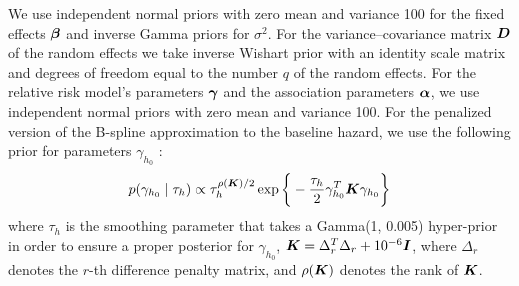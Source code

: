 We use independent normal priors with zero mean and variance 100 for the fixed effects $\boldsymbol{\beta}$ and inverse Gamma priors for $\sigma^2$. For the variance–covariance matrix $\boldsymbol{D}$ of the random effects we take inverse Wishart prior with an identity scale matrix and degrees of freedom equal to the number $q$ of the random effects. For the relative risk model's parameters $\boldsymbol{\gamma}$ and the association parameters $\boldsymbol{\alpha}$, we use independent normal priors with zero mean and variance 100. For the penalized version of the B-spline approximation to the baseline hazard, we use the following prior for parameters $\gamma_{h_0}$ \citep{lang2004bayesian}:
\begin{equation*}
p(\gamma_{h_0} \mid \tau_h) \propto \tau_h^{\rho(\boldsymbol{K})/2} \exp\bigg\{-\frac{\tau_h}{2}\gamma_{h_0}^T \boldsymbol{K} \gamma_{h_0}\bigg\}
\end{equation*}
where $\tau_h$ is the smoothing parameter that takes a Gamma(1, 0.005) hyper-prior in order to ensure a proper posterior for $\gamma_{h_0}$, $\boldsymbol{K} = \Delta_r^T \Delta_r + 10^{-6} \boldsymbol{I}$, where $\Delta_r$ denotes the $r$-th difference penalty matrix, and $\rho(\boldsymbol{K})$ denotes the rank of $\boldsymbol{K}$.